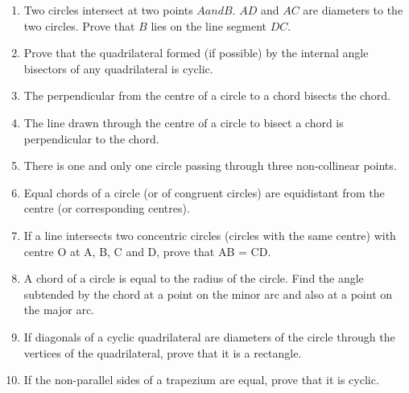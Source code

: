 \begin{enumerate}[label=\thesubsection.\arabic*,ref=\thesubsection.\theenumi]
\item Two circles intersect at two points $A and B$. $AD$ and $AC$ are diameters to the two circles. Prove that $B$ lies on the line segment $DC$.
\item Prove that the quadrilateral formed (if possible) by the internal angle bisectors of any quadrilateral is cyclic.
\item  The perpendicular from the centre of a circle to a chord bisects the chord. 
\item  The line drawn through the centre of a circle to bisect a chord is perpendicular to the chord.
\item  There is one and only one circle passing through three non-collinear points. 
\item  Equal chords of a circle (or of congruent circles) are equidistant from the centre (or corresponding centres).
\item If a line intersects two concentric circles (circles with the same centre) with centre O at A, B, C and D, prove that AB = CD.

\item A chord of a circle is equal to the radius of the
circle. Find the angle subtended by the chord at
a point on the minor arc and also at a point on the
major arc.
\item If diagonals of a cyclic quadrilateral are diameters of the circle through the vertices of
the quadrilateral, prove that it is a rectangle.
\item If the non-parallel sides of a trapezium are equal, prove that it is cyclic.

\end{enumerate}
